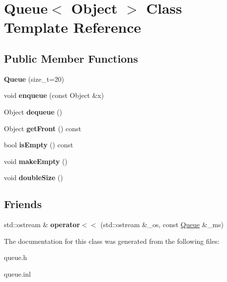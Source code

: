 \hypertarget{class_queue}{}\section{Queue$<$ Object $>$ Class Template Reference}
\label{class_queue}
\subsection*{Public Member Functions}
\begin{DoxyCompactItemize}
\item 
{\bfseries Queue} (size\+\_\+t=20)\hypertarget{class_queue_a585d021f4c70982d31b716d68cf1a2da}{}\label{class_queue_a585d021f4c70982d31b716d68cf1a2da}

\item 
void {\bfseries enqueue} (const Object \&x)\hypertarget{class_queue_acd70b6b7c21cb08c3854cabbf51215a3}{}\label{class_queue_acd70b6b7c21cb08c3854cabbf51215a3}

\item 
Object {\bfseries dequeue} ()\hypertarget{class_queue_a01e4ea1d38d26b658b0e5419087448cc}{}\label{class_queue_a01e4ea1d38d26b658b0e5419087448cc}

\item 
Object {\bfseries get\+Front} () const \hypertarget{class_queue_a1407aa92c2fe2568b2db505a2b940d3e}{}\label{class_queue_a1407aa92c2fe2568b2db505a2b940d3e}

\item 
bool {\bfseries is\+Empty} () const \hypertarget{class_queue_a4992e283dbeb7b3565101dedbf79917c}{}\label{class_queue_a4992e283dbeb7b3565101dedbf79917c}

\item 
void {\bfseries make\+Empty} ()\hypertarget{class_queue_a8879ec46068d4c7ca52720270216edec}{}\label{class_queue_a8879ec46068d4c7ca52720270216edec}

\item 
void {\bfseries double\+Size} ()\hypertarget{class_queue_a9af7b49520fbf88c97c85b75fd651d12}{}\label{class_queue_a9af7b49520fbf88c97c85b75fd651d12}

\end{DoxyCompactItemize}
\subsection*{Friends}
\begin{DoxyCompactItemize}
\item 
std\+::ostream \& {\bfseries operator$<$$<$} (std\+::ostream \&\+\_\+os, const \hyperlink{class_queue}{Queue} \&\+\_\+ms)\hypertarget{class_queue_accec0bce21c7243d5bd83c4276a51252}{}\label{class_queue_accec0bce21c7243d5bd83c4276a51252}

\end{DoxyCompactItemize}


The documentation for this class was generated from the following files\+:\begin{DoxyCompactItemize}
\item 
queue.\+h\item 
queue.\+inl\end{DoxyCompactItemize}
